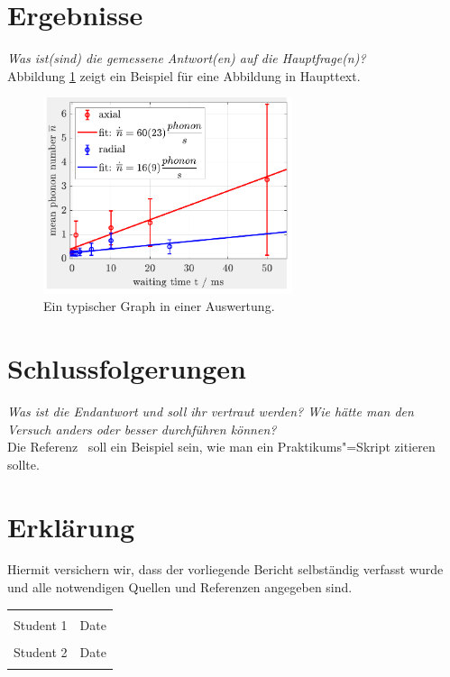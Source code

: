 \documentclass[11pt,a4paper]{scrartcl}
\begin{document}
\section{Ergebnisse}
\label{sec:Ergebnisse}
%
\textit{Was ist(sind) die gemessene Antwort(en) auf die Hauptfrage(n)?}\\
Abbildung \ref{fig:examplfig} zeigt ein Beispiel für eine Abbildung in Haupttext.
\begin{figure}[htb!]
 \centering
 \includegraphics[width=0.65\textwidth]{good_example_plot}
 \caption{\label{fig:examplfig}Ein typischer Graph in einer Auswertung.
 }
\end{figure}
%
\section{Schlussfolgerungen}
\label{sec:Schlussf}
%
\textit{Was ist die Endantwort und soll ihr vertraut werden?  Wie hätte man den Versuch anders oder besser durchführen können?}\\
Die Referenz~\cite{GP1StromSpannung} soll ein Beispiel sein, wie man ein Praktikums"=Skript zitieren sollte. 
%

\printbibliography[]
\vfill
\section*{Erklärung}

Hiermit versichern wir, dass der vorliegende Bericht selbständig verfasst wurde und alle notwendigen Quellen und Referenzen angegeben sind.

\begin{tabular}{@{}p{2.5in}p{2.5in}@{}}
 \\[5\bigskipamount]
  \dotfill & \dotfill \\
  Student 1 & Date \\[5\bigskipamount]
  \dotfill & \dotfill \\
 Student 2 & Date \\
  \centering
  
\end{tabular}
\end{document}
